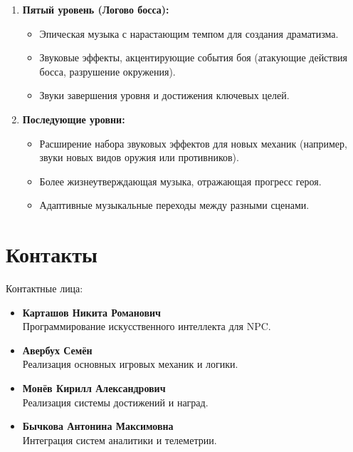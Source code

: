 \documentclass[12pt]{article}
\begin{document}
\begin{enumerate}
    \item \textbf{Пятый уровень (Логово босса):}
    \begin{itemize}
        \item Эпическая музыка с нарастающим темпом для создания драматизма.
        \item Звуковые эффекты, акцентирующие события боя (атакующие действия босса, разрушение окружения).
        \item Звуки завершения уровня и достижения ключевых целей.
    \end{itemize}
    
    \item \textbf{Последующие уровни:}
    \begin{itemize}
        \item Расширение набора звуковых эффектов для новых механик (например, звуки новых видов оружия или противников).
        \item Более жизнеутверждающая музыка, отражающая прогресс героя.
        \item Адаптивные музыкальные переходы между разными сценами.
    \end{itemize}
\end{enumerate}
    
\section{Контакты}

Контактные лица:  
\begin{itemize}
    \item \textbf{Карташов Никита Романович} \\  
    Программирование искусственного интеллекта для NPC.  
    \item \textbf{Авербух Семён } \\  
    Реализация основных игровых механик и логики.  
    \item \textbf{Монёв Кирилл Александрович} \\  
    Реализация системы достижений и наград.  
    \item \textbf{Бычкова Антонина Максимовна} \\  
    Интеграция систем аналитики и телеметрии.  
\end{itemize}


\newpage
\end{document}

